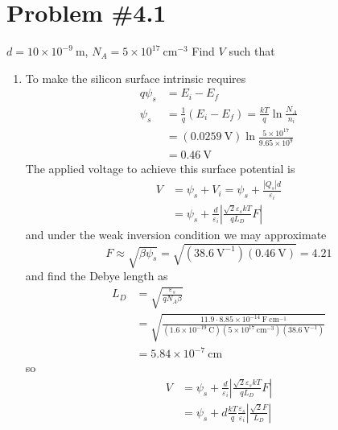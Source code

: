 \documentclass{article}
\begin{document}
\section*{Problem \#4.1}
$d = 10 \times 10^{-9} ~\mathrm{m}$, $N_A = 5 \times 10^{17} ~\mathrm{cm}^{-3}$
Find $V$ such that
\begin{enumerate}
  \item{To make the silicon surface intrinsic requires 
        \begin{align*}
        q\psi_s &= E_i - E_f \\
        \psi_s &= \frac{1}{q}(E_i - E_f) = \frac{kT}{q} \ln \frac{N_A}{n_i} \\
               &= (0.0259 ~\mathrm{V}) \ln \frac{5 \times 10^{17}}{9.65 \times 10^9} \\
               &= 0.46 ~\mathrm{V}
        \end{align*}
        The applied voltage to achieve this surface potential is  
        \begin{align*}
        V &= \psi_s + V_i = \psi_s + \frac{|Q_s|d}{\varepsilon_i} \\
          &= \psi_s + \frac{d}{\varepsilon_i}
                      \left|\frac{\sqrt{2}\varepsilon_s kT}{q L_D} 
                            F\right|
        \end{align*}
        and under the weak inversion condition we may approximate 
        $$
        F \approx \sqrt{\beta \psi_s} 
          = \sqrt{(38.6 ~\mathrm{V}^{-1})(0.46 ~\mathrm{V})} = 4.21
        $$
        and find the Debye length as
        \begin{align*}
        L_D &= \sqrt{\frac{\varepsilon_s}{q N_A \beta}} \\
            &= \sqrt{\frac{11.9 \cdot 8.85 \times 10^{-14} ~\mathrm{F}~\mathrm{cm}^{-1}}
                         {(1.6 \times 10^{-19} ~\mathrm{C})
                          (5 \times 10^{17} ~\mathrm{cm}^{-3})
                          (38.6 ~\mathrm{V}^{-1})}} \\
            &= 5.84 \times 10^{-7} ~\mathrm{cm}
        \end{align*}
         so
        \begin{align*}
        V &= \psi_s + \frac{d}{\varepsilon_i}
                      \left|\frac{\sqrt{2}\varepsilon_s kT}{q L_D} 
                            F\right| \\
          &= \psi_s + d\frac{kT}{q} \frac{\varepsilon_s}{\varepsilon_i}
                      \left|\frac{\sqrt{2}F}{L_D}\right| \\

\end{align*}}
\end{enumerate}
\end{document}
